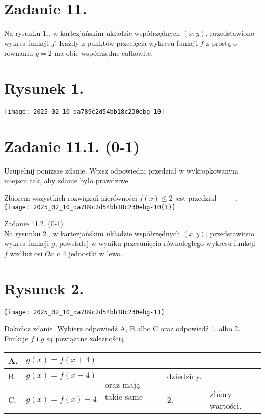 \documentclass[10pt]{article}
\begin{document}
\section*{Zadanie 11.}
Na rysunku 1., w kartezjańskim układzie współrzędnych \((x, y)\), przedstawiono wykres funkcji \(f\). Każdy z punktów przecięcia wykresu funkcji \(f\) z prostą o równaniu \(y=2\) ma obie współrzędne całkowite.

\section*{Rysunek 1.}
\begin{center}
\texttt{[image: 2025\_02\_10\_da789c2d54bb18c230ebg-10]}
\end{center}

\section*{Zadanie 11.1. (0-1)}
Uzupełnij poniższe zdanie. Wpisz odpowiedni przedział w wykropkowanym miejscu tak, aby zdanie było prawdziwe.

Zbiorem wszystkich rozwiązań nierówności \(f(x) \leq 2\) jest przedział \(\qquad\) .\\
\texttt{[image: 2025\_02\_10\_da789c2d54bb18c230ebg-10(1)]}

Zadanie 11.2. (0-1)\\
Na rysunku 2., w kartezjańskim układzie współrzędnych \((x, y)\), przedstawiono wykres funkcji \(g\), powstałej w wyniku przesunięcia równoległego wykresu funkcji \(f\) wzdłuż osi \(O x\) o 4 jednostki w lewo.

\section*{Rysunek 2.}
\begin{center}
\texttt{[image: 2025\_02\_10\_da789c2d54bb18c230ebg-11]}
\end{center}

Dokończ zdanie. Wybierz odpowiedź A, B albo C oraz odpowiedź 1. albo 2.\\
Funkcje \(f\) i \(g\) są powiązane zależnością

\begin{center}
\begin{tabular}{|l|l|l|l|l|}
\hline
A. & \(g(x)=f(x+4)\) &  &  &  \\
\hline
B. & \(g(x)=f(x-4)\) & \multirow{3}{*}{oraz mają takie same} & dziedziny. &  \\
\cline { 1 - 1 }
 &  &  &  &  \\
\hline
C. & \(g(x)=f(x)-4\) &  & 2. & zbiory wartości. \\
\hline
\end{tabular}
\end{center}
\end{document}
